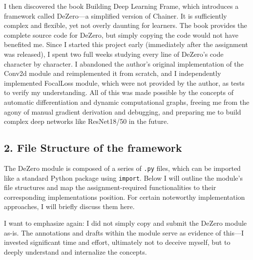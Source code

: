 \documentclass{article}
\newcommand{\subs}[1]{\subsection*{#1}}
\begin{document}
I then discovered the book Building Deep Learning Frame, which introduces a framework called DeZero—a simplified version of Chainer. It is sufficiently complex and flexible, yet not overly daunting for learners. The book provides the complete source code for DeZero, but simply copying the code would not have benefited me. Since I started this project early (immediately after the assignment was released), I spent two full weeks studying every line of DeZero's code character by character. I abandoned the author’s original implementation of the Conv2d module and reimplemented it from scratch, and I independently implemented FocalLoss module, which were not provided by the author, as tests to verify my understanding. All of this was made possible by the concepts of automatic differentiation and dynamic computational graphs, freeing me from the agony of manual gradient derivation and debugging, and preparing me to build complex deep networks like ResNet18/50 in the future.

\subs{2. File Structure of the framework}
The DeZero module is composed of a series of \texttt{.py} files, which can be imported like a standard Python package using \texttt{import}. Below I will outline the module's file structures and map the assignment-required functionalities to their corresponding implementations position. For certain noteworthy implementation approaches, I will briefly discuss them here.

I want to emphasize again: I did not simply copy and submit the DeZero module as-is. The annotations and drafts within the module serve as evidence of this—I invested significant time and effort, ultimately not to deceive myself, but to deeply understand and internalize the concepts.
\end{document}
